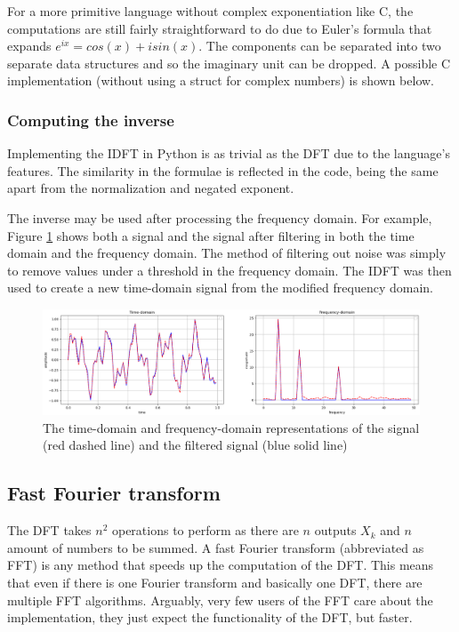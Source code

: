

For a more primitive language without complex exponentiation like C, the computations are still fairly straightforward to do due to Euler's formula that expands $e^{ix} = cos(x) + isin(x)$. The components can be separated into two separate data structures and so the imaginary unit can be dropped. A possible C implementation (without using a struct for complex numbers) is shown below. 



\subsubsection{Computing the inverse}

Implementing the IDFT in Python is as trivial as the DFT due to the language's features. The similarity in the formulae is reflected in the code, being the same apart from the normalization and negated exponent. 



The inverse may be used after processing the frequency domain. For example,  Figure \ref{fig:DFT-IDFT} shows both a signal and the signal after filtering in both the time domain and the frequency domain. The method of filtering out noise was simply to remove values under a threshold in the frequency domain. The IDFT was then used to create a new time-domain signal from the modified frequency domain.

\begin{figure}[ht]
    \centering
    \includegraphics[width=\textwidth]{./images/filtered_signal.png}
    \caption{The time-domain and frequency-domain representations of the signal (red dashed line) and the filtered signal (blue solid line)\label{fig:DFT-IDFT}}
\end{figure}

\subsection{Fast Fourier transform}
The DFT takes $n^2$ operations to perform as there are $n$ outputs $X_k$ and $n$ amount of numbers to be summed. A fast Fourier transform (abbreviated as FFT) is any method that speeds up the computation of the DFT. This means that even if there is one Fourier transform and basically one DFT, there are multiple FFT algorithms. Arguably, very few users of the FFT care about the implementation, they just expect the functionality of the DFT, but faster. 

